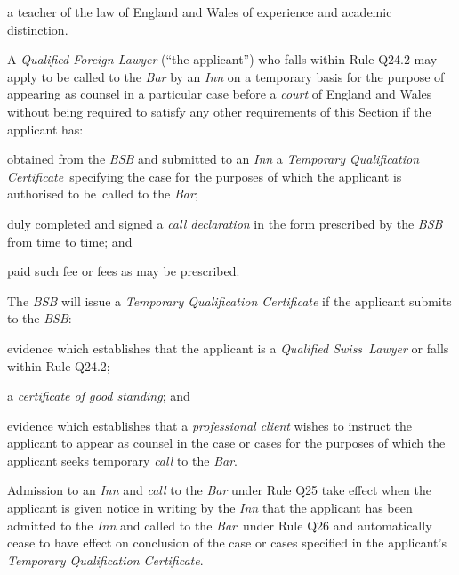  \item a teacher of the law of England and Wales of experience and academic
distinction.\ln




A \emph{Qualified Foreign Lawyer} (``the applicant'') who falls within
Rule Q24.2 may apply to be called to the \emph{Bar} by an \emph{Inn} on
a temporary basis for the purpose of appearing as counsel in a
particular case before a \emph{court} of England and Wales without being
required to satisfy any other requirements of this Section if the
applicant has:

 \nl  \item obtained from the \emph{BSB} and submitted to an \emph{Inn} a
\emph{Temporary Qualification Certificate~}specifying the case for the
purposes of which the applicant is authorised to be~called to the
\emph{Bar};

 \item duly completed and signed a \emph{call declaration} in the form
prescribed by the \emph{BSB} from time to time; and

 \item paid such fee or fees as may be prescribed.\ln


The \emph{BSB} will issue a \emph{Temporary Qualification Certificate}
if the applicant submits to the \emph{BSB}:

\nl
 \item evidence which establishes that the applicant is a \emph{Qualified
Swiss~Lawyer} or falls within Rule Q24.2;

 \item a \emph{certificate of good standing}; and

 \item evidence which establishes that a \emph{professional client} wishes
to instruct the applicant to appear as counsel in the case or cases for
the purposes of which the applicant seeks temporary \emph{call} to the
\emph{Bar}.\ln


Admission to an \emph{Inn} and \emph{call} to the \emph{Bar} under Rule
Q25 take effect when the applicant is given notice in writing by the
\emph{Inn} that the applicant has been admitted to the \emph{Inn} and
called to the \emph{Bar}~under Rule Q26 and automatically cease to have
effect on conclusion of the case or cases specified in the applicant's
\emph{Temporary Qualification Certificate}.

